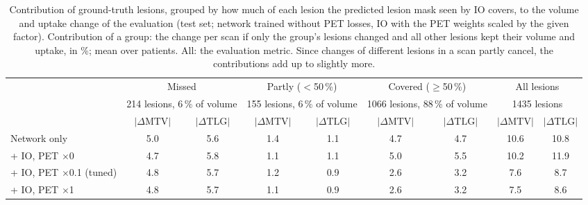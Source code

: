\begin{table}[t]
\centering
\caption{Contribution of ground-truth lesions, grouped by how much of each lesion the predicted lesion mask seen by IO covers, to the volume and uptake change of the evaluation (test set; network trained without PET losses, IO with the PET weights scaled by the given factor). Contribution of a group: the change per scan if only the group's lesions changed and all other lesions kept their volume and uptake, in \%; mean over patients. All: the evaluation metric. Since changes of different lesions in a scan partly cancel, the contributions add up to slightly more.}
\label{tab:detection_contributions}
\scriptsize
\setlength{\tabcolsep}{3pt}
\begin{tabular}{lcccccccc}
\toprule
 & \multicolumn{2}{c}{Missed} & \multicolumn{2}{c}{Partly ($<$50\,\%)} & \multicolumn{2}{c}{Covered ($\geq$50\,\%)} & \multicolumn{2}{c}{All lesions} \\
 & \multicolumn{2}{c}{\tiny 214 lesions, 6\,\% of volume} & \multicolumn{2}{c}{\tiny 155 lesions, 6\,\% of volume} & \multicolumn{2}{c}{\tiny 1066 lesions, 88\,\% of volume} & \multicolumn{2}{c}{\tiny 1435 lesions} \\
\cmidrule(lr){2-3}\cmidrule(lr){4-5}\cmidrule(lr){6-7}\cmidrule(lr){8-9}
 & $|\Delta\mathrm{MTV}|$ & $|\Delta\mathrm{TLG}|$ & $|\Delta\mathrm{MTV}|$ & $|\Delta\mathrm{TLG}|$ & $|\Delta\mathrm{MTV}|$ & $|\Delta\mathrm{TLG}|$ & $|\Delta\mathrm{MTV}|$ & $|\Delta\mathrm{TLG}|$ \\
\midrule
Network only & 5.0 & 5.6 & 1.4 & 1.1 & 4.7 & 4.7 & 10.6 & 10.8 \\
\midrule
+ IO, PET $\times$0 & 4.7 & 5.8 & 1.1 & 1.1 & 5.0 & 5.5 & 10.2 & 11.9 \\
+ IO, PET $\times$0.1 (tuned) & 4.8 & 5.7 & 1.2 & 0.9 & 2.6 & 3.2 & 7.6 & 8.7 \\
+ IO, PET $\times$1 & 4.8 & 5.7 & 1.1 & 0.9 & 2.6 & 3.2 & 7.5 & 8.6 \\
\bottomrule
\end{tabular}
\end{table}
